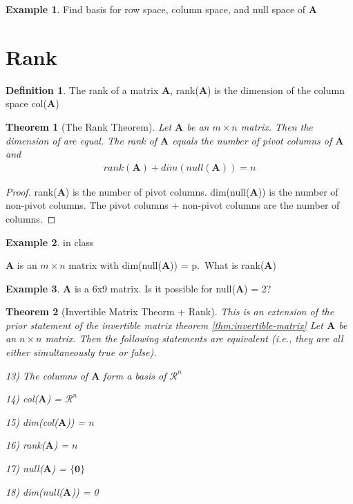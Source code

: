 \documentclass[
]{book}
\newtheorem{theorem}{Theorem}[chapter]
\theoremstyle{definition}
\newtheorem{definition}{Definition}[chapter]
\theoremstyle{definition}
\newtheorem{example}{Example}[chapter]
\theoremstyle{definition}
\theoremstyle{definition}
\theoremstyle{remark}
\begin{document}
\begin{example}
Find basis for row space, column space, and null space of \(\mathbf{A}\)
\end{example}

\hypertarget{rank-2}{%
\section{Rank}\label{rank-2}}

\begin{definition}
The rank of a matrix \(\mathbf{A}\), rank(\(\mathbf{A}\)) is the dimension of the column space col(\(\mathbf{A}\))
\end{definition}

\begin{theorem}[The Rank Theorem]
Let \(\mathbf{A}\) be an \(m \times n\) matrix. Then the dimension of are equal. The rank of \(\mathbf{A}\) equals the number of pivot columns of \(\mathbf{A}\) and
\[
\begin{aligned}
rank (\mathbf{A}) + dim(null(\mathbf{A})) = n
\end{aligned}
\]
\end{theorem}

\begin{proof}
rank(\(\mathbf{A}\)) is the number of pivot columns. dim(null(\(\mathbf{A}\))) is the number of non-pivot columns. The pivot columns + non-pivot columns are the number of columns.
\end{proof}

\begin{example}
in class

\(\mathbf{A}\) is an \(m \times n\) matrix with dim(null(\(\mathbf{A}\))) = p.~What is rank(\(\mathbf{A}\))
\end{example}

\begin{example}
\(\mathbf{A}\) is a 6x9 matrix. Is it possible for null(\(\mathbf{A}\)) = 2?
\end{example}

\begin{theorem}[Invertible Matrix Theorm + Rank]
This is an extension of the prior statement of the invertible matrix theorem \ref{thm:invertible-matrix}
Let \(\mathbf{A}\) be an \(n \times n\) matrix. Then the following statements are equivalent (i.e., they are all either simultaneously true or false).

13) The columns of \(\mathbf{A}\) form a basis of \(\mathcal{R}^n\)

14) col(\(\mathbf{A}\)) = \(\mathcal{R}^n\)

15) dim(col(\(\mathbf{A}\))) = \(n\)

16) rank(\(\mathbf{A}\)) = \(n\)

17) null(\(\mathbf{A}\)) = \(\{\mathbf{0}\}\)

18) dim(null(\(\mathbf{A}\))) = 0
\end{theorem}
\end{document}

